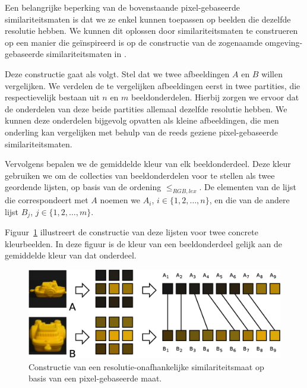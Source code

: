 Een belangrijke beperking van de bovenstaande pixel-gebaseerde similariteitsmaten is dat we
ze enkel kunnen toepassen op beelden die dezelfde resolutie hebben. We kunnen dit oplossen
door similariteitsmaten te construeren op een manier die ge\"inspireerd is op de constructie
van de zogenaamde omgeving-gebaseerde similariteitsmaten in \cite{vanderweken:similariteitsmaten}. 

Deze constructie gaat als volgt. Stel dat we twee afbeeldingen $A$ en $B$ willen
vergelijken. We verdelen
de te vergelijken afbeeldingen eerst in twee partities, die respectievelijk bestaan uit
$n$ en $m$ beeldonderdelen. Hierbij zorgen we ervoor dat de onderdelen
van deze beide partities allemaal dezelfde resolutie hebben. We kunnen deze onderdelen bijgevolg 
opvatten als kleine afbeeldingen, die men onderling kan vergelijken met behulp van de reeds 
geziene pixel-gebaseerde similariteitsmaten.

Vervolgens bepalen we de gemiddelde kleur van elk beeldonderdeel. Deze kleur gebruiken we om
de collecties van beeldonderdelen voor te stellen als twee geordende lijsten, op basis
van de ordening $\leq_{RGB,lex}$. De elementen van de lijst die correspondeert met $A$ noemen 
we $A_i$, $i \in \{1,2,\ldots,n\}$, en die van de andere lijst $B_j$, $j \in \{1,2,\ldots,m\}$.

Figuur~\ref{fig:multires} illustreert de constructie van deze lijsten voor twee concrete
kleurbeelden. In deze figuur is de kleur van een beeldonderdeel gelijk aan de gemiddelde 
kleur van dat onderdeel.
\begin{figure}[tbp]
\begin{center}
\includegraphics[width=\textwidth]{images/multires.eps}
\caption{\label{fig:multires}Constructie van een resolutie-onafhankelijke similariteitsmaat op basis van een pixel-gebaseerde maat.}
\end{center}
\end{figure}

